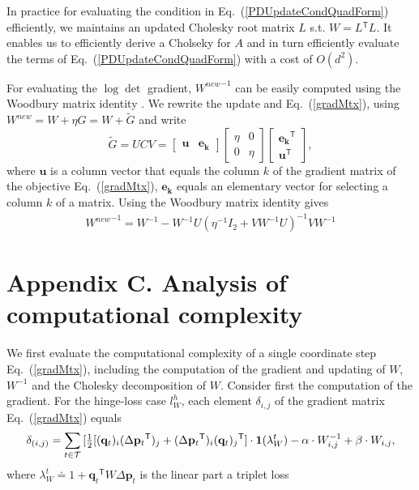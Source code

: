 \documentclass[twoside,11pt]{article}
\newcommand\mat[1]{{#1}}
\renewcommand\vec[1]{\mathbf{#1}}
\newcommand{\T}{{}^\mathsf{T}}
\newcommand{\W}{\mat{W}}
\newcommand{\newW}{{\mat{W^{new}}}}
\newcommand{\eqdef}{\doteq}
\newcommand{\q}{{\vec{q}}}
\newcommand{\p}{{\vec{p}}}
\newcommand{\trip}{{t}}
\newcommand{\qt}{{\q_{\trip}}}
\newcommand{\cholL}{\mat{L}}
\newcommand{\A}{\mat{A}}
\renewcommand{\eqref}[1]{Eq.~(\ref{#1})}
\begin{document}
In practice for evaluating the condition in \eqref{PDUpdateCondQuadForm} efficiently, we maintains an updated Cholesky root matrix $\cholL$ s.t. $\W = \cholL\T \cholL$. It enables us to efficiently derive a Cholseky for $\A$ \citep{Davis05rowchol} and in turn efficiently evaluate the terms of \eqref{PDUpdateCondQuadForm} with a cost of $O(d^2)$. 

For evaluating the $\log\det$ gradient, $\newW^{-1}$ can be easily computed using the Woodbury matrix
identity \citep{woodbury1950inverting}. We rewrite the update and \eqref{gradMtx}, using $\newW = \W + \eta G = \W+\mat{\widetilde{G}}$
and write
\begin{equation}
  \mat{\widetilde{G}} = \mat{U}\mat{C}\mat{V} = \left[ \begin{matrix}
      \vec{u} & \vec{e_k} \end{matrix} \right] \left[ \begin{matrix}
      \eta & 0 \\ 0 & \eta \end{matrix} \right] \left[ \begin{matrix}
      \vec{e_k}\T \\ \vec{u}\T \end{matrix} \right],
  \label{gradMtxWDB}
  \nonumber 
\end{equation}
where $\vec{u}$ is a column vector that equals the column $k$ of the gradient matrix of the objective \eqref{gradMtx},
$\vec{e_k}$ equals an elementary vector for selecting a column $k$ of
a matrix. 
Using the Woodbury matrix identity gives 
\begin{equation}
    \begin{array}{lcl}
    \newW^{-1} = 
    \W^{-1} - \W^{-1} \mat{U} (\eta^{-1} I_2 + \mat{V}     \W^{-1} \mat{U})^{-1} \mat{V} \W^{-1}
    \end{array}
    \nonumber
    \label{InvWwdb}
\end{equation}

 

\section*{Appendix C. Analysis of computational complexity}


We first evaluate the computational complexity of a single coordinate step \eqref{gradMtx}, including the computation of the gradient and updating of $\W$, $\W^{-1}$ and the Cholesky decomposition of $\W$. Consider first the computation of the gradient. For the hinge-loss case $l^{h}_W$, each element $\delta_{i,j}$ of the gradient matrix \eqref{gradMtx} equals
\begin{equation}
    \delta_{(i,j)} = \sum\limits_{t\in \cal{T}}{ [\tfrac{1}{2}[(\vec{q}_{t})_i(\Delta\vec{p}_{t}\T)_j + (\Delta\vec{p}_{t}\T)_i(\vec{q}_{t})_j\T] } \cdot \textbf{1}(\lambda_{W}^t) - \alpha \cdot \W^{-1}_{i,j} + \beta \cdot \W_{i,j},
\label{gradMatElem}
\end{equation}
where $\lambda_{W}^t \eqdef 1+\qt\T \W \Delta\p_{t}$ is the linear part a triplet loss
\end{document}
